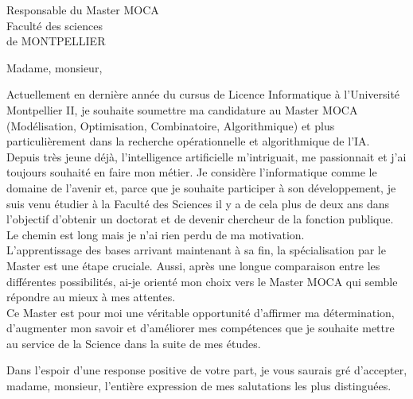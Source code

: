\documentclass[11pt]{lettre}
\begin{document}
\begin{letter}{Responsable du Master MOCA\\Faculté des sciences\\de MONTPELLIER}
\signature{J. FRANCHET}
\address{\centering\textbf{\textsc{FRANCHET Jerry}}\\48,rue de la condamine\\34970 LATTES}
\nofax 

\opening{Madame, monsieur,}

Actuellement en dernière année du cursus de Licence Informatique à l'Université Montpellier II, je souhaite soumettre ma candidature au Master MOCA (Modélisation, Optimisation, Combinatoire, Algorithmique) et plus particulièrement dans la recherche opérationnelle et algorithmique de l'IA.\\
Depuis très jeune déjà, l'intelligence artificielle m'intriguait, me passionnait et  j'ai toujours souhaité en faire mon métier.  Je considère l'informatique comme le domaine de l'avenir et, parce que je souhaite participer à son développement, je suis venu étudier à la Faculté des Sciences il y a de cela plus de deux ans dans l'objectif d'obtenir un doctorat et de devenir chercheur de la fonction publique. Le chemin est long mais je n'ai rien perdu de ma motivation.\\
L'apprentissage des bases arrivant maintenant à sa fin, la spécialisation par le Master est une étape cruciale. Aussi, après une longue comparaison entre les différentes possibilités, ai-je orienté mon choix vers le Master MOCA qui semble répondre au mieux à mes attentes.\\
Ce Master est pour moi une véritable opportunité d'affirmer ma détermination, d'augmenter mon savoir et d'améliorer mes compétences que je souhaite mettre au service de la Science dans la suite de mes études.

\closing{Dans l'espoir d'une response positive de votre part, je vous saurais gré d’accepter, madame, monsieur, l'entière expression de mes salutations les plus distinguées.}

\end{letter}
\end{document}
